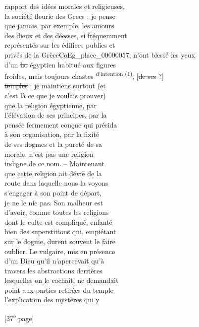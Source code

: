 \documentclass{book}
\begin{document}
{\begin{paracol}{2}
rapport des idées morales et religieuses,\\
la société fleurie des Grecs ; je pense\\
que jamais, par exemple, les amours\\
des dieux et des déesses, si fréquemment\\
représentés sur les édifices publics et\\
privés de la Grèce\gls{CoEg_place_00000057}, n’ont blessé les yeux\\
d’un \sout{ho} égyptien habitué aux figures\\
froides, mais toujours chastes \textsuperscript{d’intention (1)}, [\sout{de ses} ?]\\
\sout{temples} ; je maintiens surtout (et\\
c’est là ce que je voulais prouver)\\
que la religion égyptienne, par\\
l’élévation de ses principes, par la\\
pensée fermement conçue qui présida\\
à son organisation, par la fixité\\
de ses dogmes et la pureté de sa\\
morale, n’est pas une religion\\
indigne de ce nom. – Maintenant\\
que cette religion ait dévié de la\\
route dans laquelle nous la voyons\\
s’engager à son point de départ,\\
je ne le nie pas. Son malheur est\\
d’avoir, comme toutes les religions\\
dont le culte est compliqué, enfanté\\
bien des superstitions qui, empiétant\\
sur le dogme, durent souvent le faire\\
oublier. Le vulgaire, mis en présence\\
d’un Dieu qu’il n’apercevait qu’à\\
travers les abstractions derrières\\
lesquelles on le cachait, ne demandait\\
point aux parties retirées du temple\\
l’explication des mystères qui y
\end{paracol}

{\footnotesize\begin{center} {[37\textsuperscript{e} page]}\end{center}}

}
\end{document}

